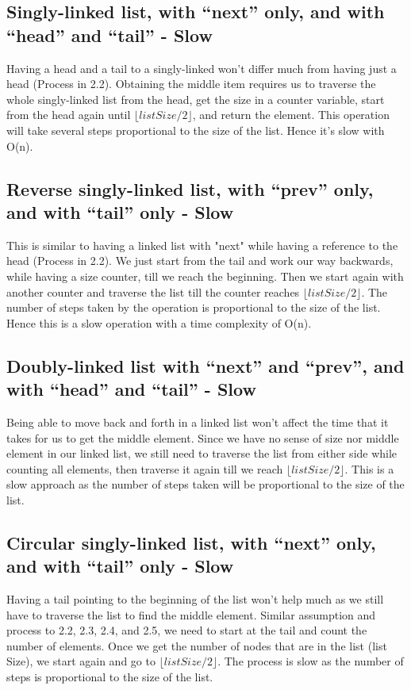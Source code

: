 \documentclass{article}
\begin{document}
\subsection{Singly-linked list, with “next” only, and with “head” and “tail” - Slow}
Having a head and a tail to a singly-linked won't differ much from having just a head (Process in 2.2). Obtaining the middle item requires us to traverse the whole singly-linked list from the head, get the size in a counter variable, start from the head again until $\lfloor {listSize/2} \rfloor$, and return the element. This operation will take several steps proportional to the size of the list. Hence it's slow with O(n).

\subsection{Reverse singly-linked list, with “prev” only, and with “tail” only - Slow}
This is similar to having a linked list with "next" while having a reference to the head (Process in 2.2). We just start from the tail and work our way backwards, while having a size counter, till we reach the beginning. Then we start again with another counter and traverse the list till the counter reaches $\lfloor {listSize/2} \rfloor$. The number of steps taken by the operation is proportional to the size of the list. Hence this is a slow operation with a time complexity of O(n).

\subsection{Doubly-linked list with “next” and “prev”, and with “head” and “tail” - Slow}
Being able to move back and forth in a linked list won't affect the time that it takes for us to get the middle element. Since we have no sense of size nor middle element in our linked list, we still need to traverse the list from either side while counting all elements, then traverse it again till we reach $\lfloor {listSize/2} \rfloor$. This is a slow approach as the number of steps taken will be proportional to the size of the list.

\subsection{Circular singly-linked list, with “next” only, and with “tail” only - Slow}
Having a tail pointing to the beginning of the list won't help much as we still have to traverse the list to find the middle element. Similar assumption and process to 2.2, 2.3, 2.4, and 2.5, we need to start at the tail and count the number of elements. Once we get the number of nodes that are in the list (list Size), we start again and go to $\lfloor {listSize/2} \rfloor$. The process is slow as the number of steps is proportional to the size of the list. 
\end{document}
